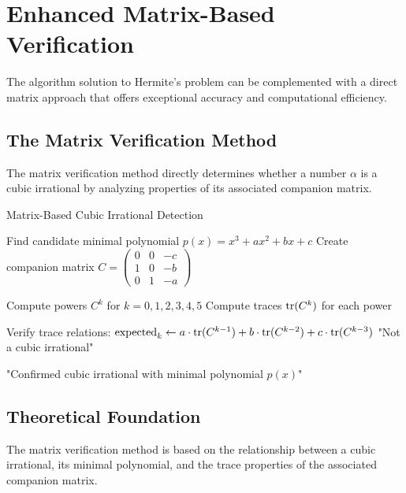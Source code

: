 \section{Enhanced Matrix-Based Verification}\label{sec:matrix_verification}

The \HAPD{} algorithm solution to Hermite's problem can be complemented with a direct matrix approach that offers exceptional accuracy and computational efficiency.

\subsection{The Matrix Verification Method}

The matrix verification method directly determines whether a number $\alpha$ is a cubic irrational by analyzing properties of its associated companion matrix.

\begin{algorithm}
\caption{Matrix-Based Cubic Irrational Detection}
\label{alg:matrix_verification}
\begin{algorithmic}[1]
    \State Find candidate minimal polynomial $p(x) = x^3 + ax^2 + bx + c$
    \State Create companion matrix $C = \begin{pmatrix} 0 & 0 & -c \\ 1 & 0 & -b \\ 0 & 1 & -a \end{pmatrix}$
    
    \State Compute powers $C^k$ for $k = 0, 1, 2, 3, 4, 5$
    \State Compute traces $\operatorname{tr}(C^k)$ for each power
    
    \State Verify trace relations:
        \State $\text{expected}_k \gets a \cdot \operatorname{tr}(C^{k-1}) + b \cdot \operatorname{tr}(C^{k-2}) + c \cdot \operatorname{tr}(C^{k-3})$
            \State \Return "Not a cubic irrational"
        \EndIf
    \EndFor
    
    \State \Return "Confirmed cubic irrational with minimal polynomial $p(x)$"
\EndProcedure
\end{algorithmic}
\end{algorithm}

\subsection{Theoretical Foundation}

The matrix verification method is based on the relationship between a cubic irrational, its minimal polynomial, and the trace properties of the associated companion matrix.

